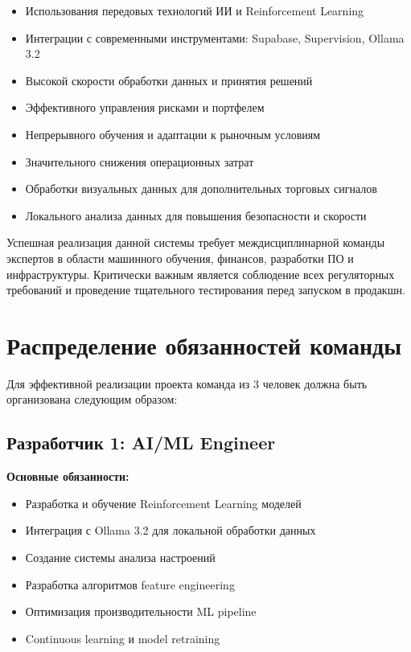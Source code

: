 \documentclass[12pt,a4paper]{article}
\begin{document}
\begin{itemize}
    \item Использования передовых технологий ИИ и Reinforcement Learning
    \item Интеграции с современными инструментами: Supabase, Supervision, Ollama 3.2
    \item Высокой скорости обработки данных и принятия решений
    \item Эффективного управления рисками и портфелем
    \item Непрерывного обучения и адаптации к рыночным условиям
    \item Значительного снижения операционных затрат
    \item Обработки визуальных данных для дополнительных торговых сигналов
    \item Локального анализа данных для повышения безопасности и скорости
\end{itemize}

Успешная реализация данной системы требует междисциплинарной команды экспертов в области машинного обучения, финансов, разработки ПО и инфраструктуры. Критически важным является соблюдение всех регуляторных требований и проведение тщательного тестирования перед запуском в продакшн.

\section{Распределение обязанностей команды}

Для эффективной реализации проекта команда из 3 человек должна быть организована следующим образом:

\subsection{Разработчик 1: AI/ML Engineer}
\textbf{Основные обязанности:}
\begin{itemize}
    \item Разработка и обучение Reinforcement Learning моделей
    \item Интеграция с Ollama 3.2 для локальной обработки данных
    \item Создание системы анализа настроений
    \item Разработка алгоритмов feature engineering
    \item Оптимизация производительности ML pipeline
    \item Continuous learning и model retraining
\end{itemize}
\end{document}
